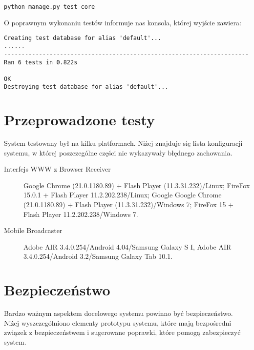 \lstset{language=Bash}
\begin{lstlisting}
python manage.py test core
\end{lstlisting}

O poprawnym wykonaniu testów informuje nas konsola, której wyjście zawiera:
\begin{lstlisting}
Creating test database for alias 'default'...
......
----------------------------------------------------------------------
Ran 6 tests in 0.822s

OK
Destroying test database for alias 'default'...
\end{lstlisting}

\section{Przeprowadzone testy}
\label{sec:EtapIprzeprowadzoneTesty}
System testowany był na kilku platformach. Niżej znajduje się lista konfiguracji systemu, w której poszczególne części nie wykazywały błędnego zachowania.

\begin{description}
    \item[Interfejs WWW z Browser Receiver] Google Chrome (21.0.1180.89) + Flash Player (11.3.31.232)/Linux; FireFox 15.0.1 + Flash Player 11.2.202.238/Linux; Google Google Chrome (21.0.1180.89) + Flash Player (11.3.31.232)/Windows 7;  FireFox 15 + Flash Player 11.2.202.238/Windows 7.
    \item[Mobile Broadcaster] Adobe AIR 3.4.0.254/Android 4.04/Samsung Galaxy S I, Adobe AIR 3.4.0.254/Android 3.2/Samsung Galaxy Tab 10.1.
\end{description}

\section{Bezpieczeństwo}
\label{sec:ImplementacjaPrototypuBezpieczenstwo}
Bardzo ważnym aspektem docelowego systemu powinno być bezpieczeństwo. Niżej wyszczególniono elementy prototypu systemu, które mają bezpośredni związek z bezpieczeństwem i sugerowane poprawki, które pomogą zabezpieczyć system.

